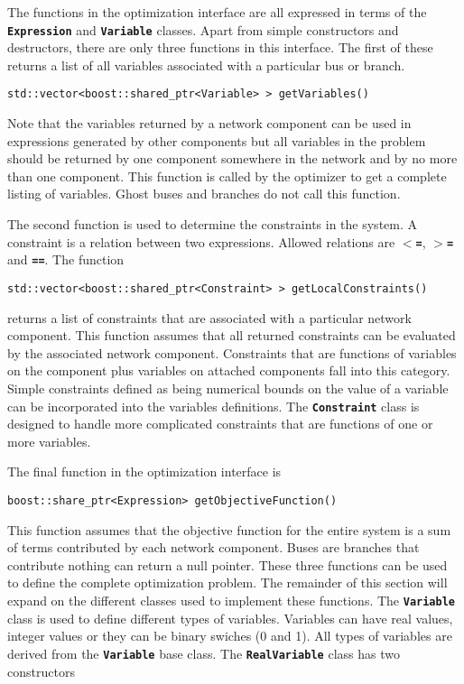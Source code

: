 The functions in the optimization interface are all expressed in terms of the \texttt{\textbf{Expression}} and \texttt{\textbf{Variable}} classes. Apart from simple constructors and destructors, there are only three functions in this interface. The first of these returns a list of all variables associated with a particular bus or branch.

{
\color{red}
\begin{Verbatim}[fontseries=b]
std::vector<boost::shared_ptr<Variable> > getVariables()
\end{Verbatim}
}

Note that the variables returned by a network component can be used in expressions generated by other components but all variables in the problem should be returned by one component somewhere in the network and by no more than one component. This function is called by the optimizer to get a complete listing of variables. Ghost buses and branches do not call this function.

The second function is used to determine the constraints in the system. A constraint is a relation between two expressions. Allowed relations are \texttt{\textbf{$\boldsymbol{\mathrm{<}}$=}}, \texttt{\textbf{$\boldsymbol{\mathrm{>}}$=}} and \texttt{\textbf{==}}. The function

{
\color{red}
\begin{Verbatim}[fontseries=b]
std::vector<boost::shared_ptr<Constraint> > getLocalConstraints()
\end{Verbatim}
}

returns a list of constraints that are associated with a particular network component. This function assumes that all returned constraints can be evaluated by the associated network component. Constraints that are functions of variables on the component plus variables on attached components fall into this category. Simple constraints defined as being numerical bounds on the value of a variable can be incorporated into the variables definitions. The \texttt{\textbf{Constraint}} class is designed to handle more complicated constraints that are functions of one or more variables.

The final function in the optimization interface is

{
\color{red}
\begin{Verbatim}[fontseries=b]
boost::share_ptr<Expression> getObjectiveFunction()
\end{Verbatim}
}

This function assumes that the objective function for the entire system is a sum of terms contributed by each network component. Buses are branches that contribute nothing can return a null pointer. These three functions can be used to define the complete optimization problem. The remainder of this section will expand on the different classes used to implement these functions.
The \texttt{\textbf{Variable}} class is used to define different types of variables. Variables can have real values, integer values or they can be binary swiches (0 and 1). All types of variables are derived from the \texttt{\textbf{Variable}} base class. The \texttt{\textbf{RealVariable}} class has two constructors

